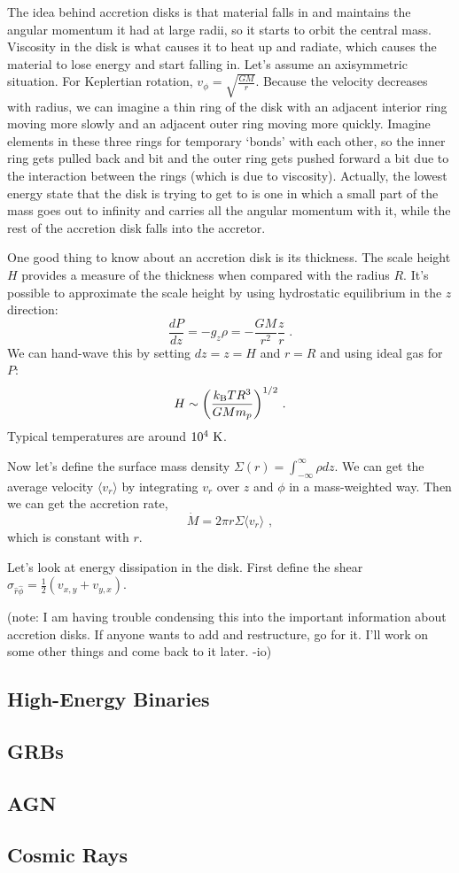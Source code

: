 The idea behind accretion disks is that material falls in and maintains the angular momentum it had at large radii, so it starts to orbit the central mass. Viscosity in the disk is what causes it to heat up and radiate, which causes the material to lose energy and start falling in. Let's assume an axisymmetric situation. For Keplertian rotation, $v_\phi = \sqrt{\frac{GM}{r}}$. Because the velocity decreases with radius, we can imagine a thin ring of the disk with an adjacent interior ring moving more slowly and an adjacent outer ring moving more quickly. Imagine elements in these three rings for temporary `bonds' with each other, so the inner ring gets pulled back and bit and the outer ring gets pushed forward a bit due to the interaction between the rings (which is due to viscosity). Actually, the lowest energy state that the disk is trying to get to is one in which a small part of the mass goes out to infinity and carries all the angular momentum with it, while the rest of the accretion disk falls into the accretor.

One good thing to know about an accretion disk is its thickness. The scale height $H$ provides a measure of the thickness when compared with the radius $R$. It's possible to approximate the scale height by using hydrostatic equilibrium in the $z$ direction:
\begin{equation}
\frac{dP}{dz} = -g_z \rho = -\frac{GM}{r^2} \frac{z}{r}\,\,.
\end{equation}
We can hand-wave this by setting $dz = z = H$ and $r = R$ and using ideal gas for $P$:
\begin{equation}
H \sim \biggl( \frac{k_{\rm B} T R^3}{GM m_p}\biggr)^{1/2}\,\,.
\end{equation}
Typical temperatures are around $10^4~{\rm K}$.

Now let's define the surface mass density $\Sigma(r) = \int^\infty_{-\infty} \rho dz$. We can get the average velocity $\langle v_r \rangle$ by integrating $v_r$ over $z$ and $\phi$ in a mass-weighted way. Then we can get the accretion rate,
\begin{equation}
\dot{M} = 2 \pi r \Sigma \langle v_r \rangle\,\, ,
\end{equation}
which is constant with $r$.

Let's look at energy dissipation in the disk. First define the shear $\sigma_{\hat{r}\hat{\phi}} = \frac{1}{2}(v_{x,y} + v_{y,x})$.

(note: I am having trouble condensing this into the important information about accretion disks. If anyone wants to add and restructure, go for it. I'll work on some other things and come back to it later. -io)

\subsection{High-Energy Binaries}

\subsection{GRBs}

\subsection{AGN}

\subsection{Cosmic Rays}
